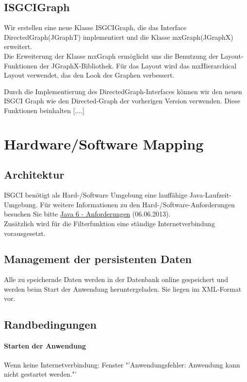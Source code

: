 \documentclass[10pt,a4paper]{article}
\begin{document}
\subsection{ISGCIGraph}
Wir erstellen eine neue Klasse ISGCIGraph, die das Interface DirectedGraph(JGraphT) implementiert und die Klasse mxGraph(JGraphX) erweitert.\\
Die Erweiterung der Klasse mxGraph ermöglicht uns die Benutzung der Layout-Funktionen der JGraphX-Bibliothek. Für das Layout wird das mxHierarchical Layout verwendet, das den Look des Graphen verbessert. 


Durch die Implementierung des DirectedGraph-Interfaces können wir den neuen ISGCI Graph wie den Directed-Graph der vorherigen Version verwenden. Diese Funktionen beinhalten [....]




\newpage
\section{Hardware/Software Mapping}
\subsection{Architektur}
ISGCI benötigt als Hard-/Software Umgebung eine lauffähige Java-Laufzeit-Umgebung. Für weitere Informationen zu den Hard-/Software-Anforderungen besuchen Sie bitte 
\href{http://www.oracle.com/technetwork/java/javase/system-configurations-135212.html}{Java 6 - Anforderungen} (06.06.2013).
\\Zusätzlich wird für die Filterfunktion eine ständige Internetverbindung vorausgesetzt.

\subsection{Management der persistenten Daten}
Alle zu speichernde Daten werden in der Datenbank online gespeichert und werden beim Start der Anwendung heruntergeladen. Sie liegen im XML-Format vor.

\subsection{Randbedingungen}
\paragraph{Starten der Anwendung}
Wenn keine Internetverbindung: Fenster "'Anwendungsfehler: Anwendung kann nicht gestartet werden."'
\end{document}
